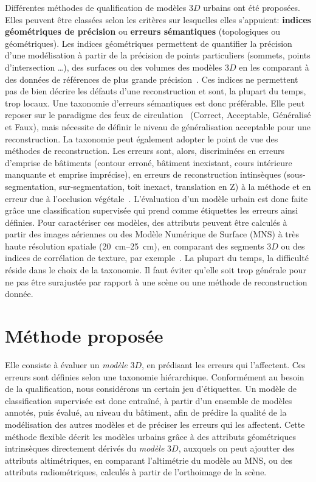 \documentclass[a4paper,french]{article}
\begin{document}
    Différentes méthodes de qualification de modèles $3D$ urbains ont été proposées. Elles peuvent être classées selon les critères sur lesquelles elles s'appuient: \textbf{indices géométriques de précision} ou \textbf{erreurs sémantiques} (topologiques ou géométriques). Les indices géométriques permettent de quantifier la précision d'une modélisation à partir de la précision de points {\color{black}particuliers} (sommets, points d'intersection \dots), des surfaces ou des volumes des modèles $3D$ en les comparant à des données de références de plus grande précision~\cite{Zeng2014}. Ces indices ne permettent pas de bien décrire les défauts d'une reconstruction et sont, la plupart du temps, trop locaux. Une taxonomie d'erreurs sémantiques est donc préférable. Elle peut reposer sur le paradigme des feux de circulation~\cite{boudet2006supervised} (Correct, Acceptable, Généralisé et Faux){\color{black}, mais nécessite de définir le niveau de généralisation acceptable pour une reconstruction. La taxonomie peut également} adopter le point de vue des méthodes de reconstruction. Les erreurs sont, alors, discriminées en erreurs d'emprise de bâtiments (contour erroné, bâtiment inexistant, cours intérieure manquante et emprise imprécise), en erreurs de reconstruction intinsèques (sous-segmentation, sur-segmentation, toit inexact, translation en Z) à la méthode et en erreur due à l'occlusion végétale~\cite{Michelin2013}. L'évaluation d'un modèle urbain est donc faite grâce une classification supervisée qui prend comme étiquettes les erreurs ainsi définies. Pour caractériser ces modèles, des attributs peuvent être calculés à partir des images aériennes ou des Modèle Numérique de Surface (MNS) à très haute résolution spatiale (\SIrange{20}{25}{\cm}), en comparant des segments $3D$ ou des indices de corrélation de texture, par exemple{\color{black}~\cite{boudet2006supervised, Michelin2013}. La plupart du temps, la difficulté réside dans le choix de la taxonomie. Il faut éviter} qu'elle soit trop générale pour ne pas être surajustée par rapport à une scène ou une méthode de reconstruction donnée.

    \section{Méthode proposée}

    Elle consiste à évaluer un \textit{modèle} $3D$, en prédisant les erreurs qui l'affectent. Ces erreurs sont définies selon une taxonomie hiérarchique. Conformément au besoin de la qualification, nous considérons un certain jeu d'étiquettes. Un modèle de classification supervisée est donc entraîné, à partir d'un ensemble de modèles annotés, puis évalué{\color{black}, au niveau du bâtiment,} afin de prédire la qualité de la modélisation des autres modèles et de préciser les erreurs qui les affectent. Cette méthode flexible décrit les modèles urbains grâce à des attributs géométriques intrinsèques directement dérivés du \textit{modèle} $3D$, auxquels on peut ajoutter des attributs altimétriques, en comparant l'altimétrie du modèle au MNS, ou des attributs radiométriques, calculés à partir de l'orthoimage de la scène.
\end{document}
